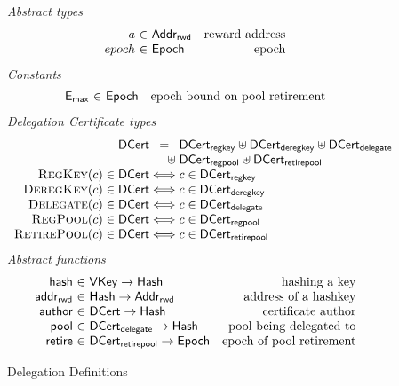 \begin{figure}
  \emph{Abstract types}
  \begin{equation*}
    \begin{array}{r@{~\in~}lr}
      a & \AddrRWD & \text{reward address} \\
      epoch & \Epoch & \text{epoch}
    \end{array}
  \end{equation*}
  \emph{Constants}
  \begin{equation*}
    \begin{array}{r@{~\in~}lr}
      \emax & \Epoch & \text{epoch bound on pool retirement}
    \end{array}
  \end{equation*}
  \emph{Delegation Certificate types}
  \begin{equation*}
  \begin{array}{r@{}c@{}l}
    \DCert &=& \DCertRegKey \uniondistinct \DCertDeRegKey \uniondistinct \DCertDeleg \\
                &\hfill\uniondistinct\;& \DCertRegPool \uniondistinct \DCertRetirePool \\
    \RegKey{c} \in \DCert &\iff& c \in \DCertRegKey \\
    \DeregKey{c} \in \DCert &\iff& c \in \DCertDeRegKey \\
    \Delegate{c} \in \DCert &\iff& c \in \DCertDeleg \\
    \RegPool{c} \in \DCert &\iff& c \in \DCertRegPool\\
    \RetirePool{c} \in \DCert &\iff& c \in \DCertRetirePool \\
  \end{array}
  \end{equation*}
  \emph{Abstract functions}
  \begin{equation*}
  \begin{array}{r@{~\in~}lr}
  \fun{hash} & \VKey \to \Hash
  & \text{hashing a key}
  \\
  \fun{addr_{rwd}} & \Hash \to \AddrRWD
  & \text{address of a hashkey}
  \\
  \fun{author} & \DCert \to \Hash
  & \text{certificate author}
  \\
  \fun{pool} & \DCertDeleg \to \Hash
  & \text{pool being delegated to}
  \\
  \fun{retire} & \DCertRetirePool \to \Epoch
  & \text{epoch of pool retirement}
  \end{array}
  \end{equation*}

  \caption{Delegation Definitions}
  \label{fig:delegation-definitons}
\end{figure}

